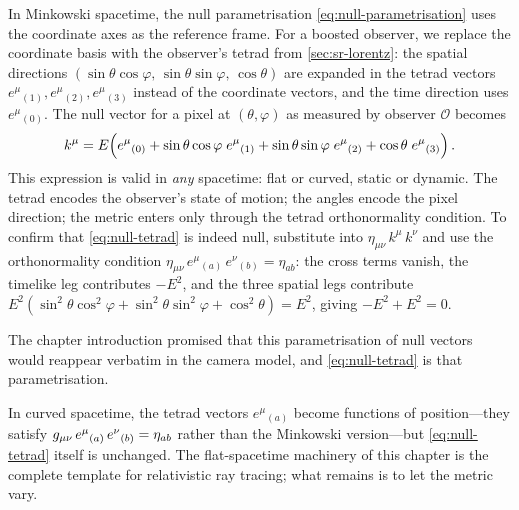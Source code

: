In Minkowski spacetime, the null parametrisation \cref{eq:null-parametrisation}
uses the coordinate axes as the reference frame.  For a boosted observer, we
replace the coordinate basis with the observer's tetrad from
\cref{sec:sr-lorentz}: the spatial directions
$(\sin\theta\cos\varphi,\, \sin\theta\sin\varphi,\, \cos\theta)$
are expanded in the tetrad vectors $e^\mu{}_{(1)}, e^\mu{}_{(2)},
e^\mu{}_{(3)}$ instead of the coordinate vectors, and the time direction uses
$e^\mu{}_{(0)}$.  The null vector for a pixel at $(\theta, \varphi)$ as
measured by observer $\mathcal{O}$ becomes
%
\begin{equation}
  k^\mu = E\Bigl(e^\mu{}_{(0)}
    + \sin\theta\cos\varphi\; e^\mu{}_{(1)}
    + \sin\theta\sin\varphi\; e^\mu{}_{(2)}
    + \cos\theta\; e^\mu{}_{(3)}\Bigr) \,.
  \label{eq:null-tetrad}
\end{equation}
%
This expression is valid in \emph{any} spacetime: flat or curved, static or
dynamic.  The tetrad encodes the observer's state of motion; the angles encode
the pixel direction; the metric enters only through the tetrad orthonormality
condition.  To confirm that \cref{eq:null-tetrad} is indeed null, substitute
into $\eta_{\mu\nu}\,k^\mu\,k^\nu$ and use the orthonormality condition
$\eta_{\mu\nu}\,e^\mu{}_{(a)}\,e^\nu{}_{(b)} = \eta_{ab}$: the cross terms
vanish, the timelike leg contributes $-E^2$, and the three spatial legs
contribute $E^2(\sin^2\theta\cos^2\varphi + \sin^2\theta\sin^2\varphi +
\cos^2\theta) = E^2$, giving $-E^2 + E^2 = 0$.

The chapter introduction promised that this parametrisation of null
vectors would reappear verbatim in the camera model, and
\cref{eq:null-tetrad} is that parametrisation.

In curved spacetime, the tetrad vectors $e^\mu{}_{(a)}$ become functions of
position---they satisfy
$g_{\mu\nu}\,e^\mu{}_{(a)}\,e^\nu{}_{(b)} = \eta_{ab}$ rather than the Minkowski
version---but \cref{eq:null-tetrad} itself is unchanged.  The flat-spacetime
machinery of this chapter is the complete template for relativistic ray tracing;
what remains is to let the metric vary.
